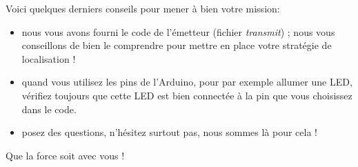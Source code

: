 \documentclass[a4paper,10pt,twoside]{article}
\begin{document}
Voici quelques derniers conseils pour mener à bien votre mission:
\begin{itemize}
	\item nous vous avons fourni le code de l'émetteur (fichier \textit{transmit}) ; nous vous conseillons de bien le comprendre pour mettre en place votre stratégie de localisation ! 
	\item quand vous utilisez les pins de l'Arduino, pour par exemple allumer une LED, vérifiez toujours que cette LED est bien connectée à la pin que vous choisissez dans le code.
	\item posez des questions, n'hésitez surtout pas, nous sommes là pour cela !
\end{itemize}

\begin{center}
Que la force soit avec vous !
\end{center}
\end{document}
